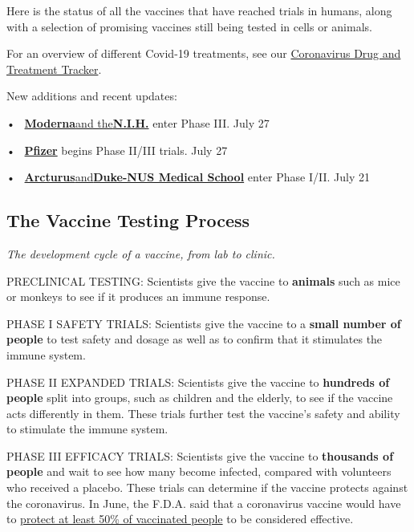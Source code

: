Here is the status of all the vaccines that have reached trials in
humans, along with a selection of promising vaccines still being tested
in cells or animals.

For an overview of different Covid-19 treatments, see our
\href{https://www.nytimes3xbfgragh.onion/interactive/2020/science/coronavirus-drugs-treatments.html}{Coronavirus
Drug and Treatment Tracker}.

New additions and recent updates:

•~
\textbf{\protect\hyperlink{moderna}{Moderna}}\protect\hyperlink{moderna}{and
the}\textbf{\protect\hyperlink{moderna}{N.I.H.}} enter Phase III. July
27

•~ \textbf{\protect\hyperlink{biontech}{Pfizer}} begins Phase II/III
trials. July 27

•~
\textbf{\protect\hyperlink{arcturus}{Arcturus}}\protect\hyperlink{arcturus}{and}\textbf{\protect\hyperlink{arcturus}{Duke-NUS
Medical School}} enter Phase I/II. July 21

\hypertarget{the-vaccine-testing-process}{%
\subsection{\texorpdfstring{\textbf{The Vaccine Testing
Process}}{The Vaccine Testing Process}}\label{the-vaccine-testing-process}}

\emph{The development cycle of a vaccine, from lab to clinic.}

PRECLINICAL TESTING: Scientists give the vaccine to \textbf{animals}
such as mice or monkeys to see if it produces an immune response.

PHASE I SAFETY TRIALS: Scientists give the vaccine to a \textbf{small
number of people} to test safety and dosage as well as to confirm that
it stimulates the immune system.

PHASE II EXPANDED TRIALS: Scientists give the vaccine to
\textbf{hundreds of people} split into groups, such as children and the
elderly, to see if the vaccine acts differently in them. These trials
further test the vaccine's safety and ability to stimulate the immune
system.

PHASE III EFFICACY TRIALS: Scientists give the vaccine to
\textbf{thousands of people} and wait to see how many become infected,
compared with volunteers who received a placebo. These trials can
determine if the vaccine protects against the coronavirus. In June, the
F.D.A. said that a coronavirus vaccine would have to
\href{https://www.fda.gov/news-events/press-announcements/coronavirus-covid-19-update-fda-takes-action-help-facilitate-timely-development-safe-effective-covid}{protect
at least 50\% of vaccinated people} to be considered effective.


